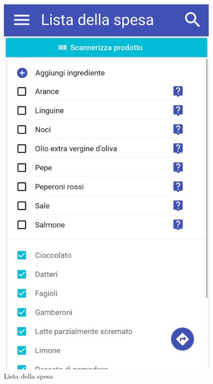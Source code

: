 \begin{figure}[H]
	\begin{minipage}{.49\textwidth}
		\includegraphics[width=\textwidth]{img/wireframe/lista_della_spesa.png}
		\caption{Lista della spesa}
		\label{fig:lista_della_spesa}
	\end{minipage}
	\hfill
	\begin{minipage}{.49\textwidth}

\end{minipage}
\end{figure}
